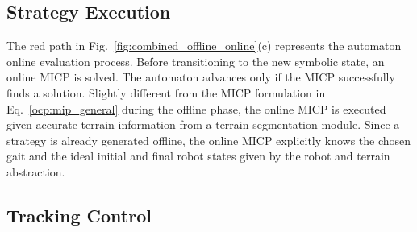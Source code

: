 \documentclass[letterpaper, 10 pt, conference]{ieeeconf}
\begin{document}
\subsection{Strategy Execution}\label{sec:automaton_online_evaluation}
The red path in Fig.~\ref{fig:combined_offline_online}(c) represents the automaton online evaluation process. Before transitioning to the new symbolic state, an online MICP is solved. The automaton advances only if the MICP successfully finds a solution.
Slightly different from the MICP formulation in Eq.~\ref{ocp:mip_general} during the offline phase, the online MICP is executed given accurate terrain information  from a terrain segmentation module. Since a strategy is already generated offline, the online MICP explicitly knows the chosen gait and the ideal initial and final robot states given by the robot and terrain abstraction.



\subsection{Tracking Control}\label{sec:tracking_control}
\end{document}
